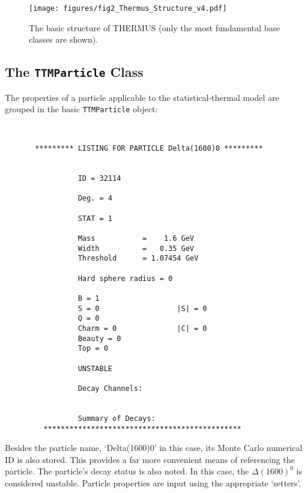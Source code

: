 \documentclass{elsarticle}
\begin{document}
\begin{figure}
\begin{center}
\texttt{[image: figures/fig2\_Thermus\_Structure\_v4.pdf]}
\caption{The basic structure of THERMUS (only the most fundamental base classes are shown).}\label{FlowChart}
\end{center}
\end{figure}

\pagebreak

\subsection{The \texttt{TTMParticle} Class} 

The properties of a particle applicable to the statistical-thermal model are grouped 
in the basic \texttt{TTMParticle} object:

\small
\begin{verbatim}


       ********* LISTING FOR PARTICLE Delta(1600)0 *********


                 ID = 32114

                 Deg. = 4

                 STAT = 1

                 Mass           =    1.6 GeV
                 Width          =   0.35 GeV
                 Threshold      = 1.07454 GeV

                 Hard sphere radius = 0

                 B = 1
                 S = 0                  |S| = 0
                 Q = 0
                 Charm = 0              |C| = 0
                 Beauty = 0
                 Top = 0

                 UNSTABLE

                 Decay Channels:


                 Summary of Decays:
         **********************************************
\end{verbatim}
\normalsize

Besides the particle name, `Delta(1600)0' in this case, its Monte Carlo numerical ID is also 
stored. This provides a far more convenient means of referencing the 
particle. The particle's decay status is also noted. In this case, the 
$\Delta(1600)^0$ is considered unstable. Particle properties are input 
using the appropriate `setters'.\\
\end{document}

